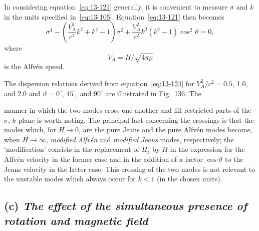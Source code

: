 In considering equation~\eqref{eq:13-121} generally, it is convenient to measure $\sigma$ and $k$ in the units specified in~\eqref{eq:13-105}. Equation~\eqref{eq:13-121} then becomes
\begin{equation}
\label{eq:13-124}
\sigma^4 - \left(\frac{V_A^2}{c^2}k^2+k^2-1\right)\sigma^2 + \frac{V_A^2}{c^2}k^2(k^2-1)\cos^2\!\vartheta = 0,
\end{equation}
where
\begin{equation}
\label{eq:13-125}
V_A = H/\sqrt{4\pi\rho}
\end{equation}
is the Alfv\'en speed.

The dispersion relations derived from equation~\eqref{eq:13-124} for $V_A^2/c^2 = 0.5$, 1.0, and 2.0 and $\vartheta = 0^\circ$, $45^\circ$, and $90^\circ$ are illustrated in Fig.~136. The


manner in which the two modes cross one another and fill restricted parts of the $\sigma$, $k$-plane is worth noting. The principal fact concerning the crossings is that the modes which, for $H \to 0$, are the pure Jeans and the pure Alfv\'en modes become, when $H \to \infty$, \textit{modified Alfv\'en} and \textit{modified Jeans} modes, respectively; the `modification' consists in the replacement of $H_z$ by $H$ in the expression for the Alfv\'en velocity in the former case and in the addition of a factor $\cos\vartheta$ to the Jeans velocity in the latter case. This crossing of the two modes is not relevant to the unstable modes which always occur for $k < 1$ (in the chosen units).

\subsection*{(c) \textit{The effect of the simultaneous presence of rotation and magnetic field}}

